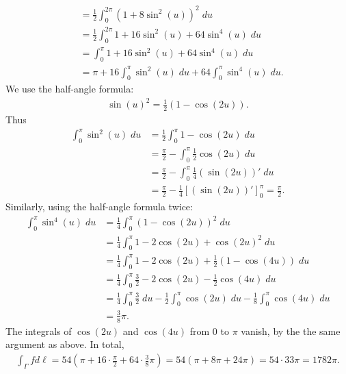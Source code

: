 \documentclass[11pt]{article}
\begin{document}
\begin{solution}
\begin{align*}
        \\&=
        \frac {1} 2 \int_0^{2\pi} \left( 1 + 8 \sin^2(u) \right)^{2} \;du
        \\&=
        \frac {1} 2 \int_0^{2\pi} 1 + 16 \sin^2(u) + 64 \sin^4(u) \;du
        \\&=
        \int_0^{\pi} 1 + 16 \sin^2(u) + 64 \sin^4(u) \;du
        \\&=
        \pi + 16 \int_0^{\pi} \sin^2(u) \;du + 64 \int_0^{\pi} \sin^4(u) \;du
        .
    \end{align*}
    We use the half-angle formula:
    \begin{align*}
        \sin(u)^2 = \frac 1 2 \left( 1 - \cos(2u) \right).
    \end{align*}
    Thus
    \begin{align*}
        \int_0^{\pi} \sin^2(u) \;du
        &=
        \frac 1 2 \int_0^{\pi} 1 - \cos(2u) \;du
        \\&=
        \frac \pi 2 - \int_0^{\pi} \frac 1 2 \cos(2u) \;du
        \\&=
        \frac \pi 2 - \int_0^{\pi} \frac 1 4 (\sin(2u))' \;du
        \\&=
        \frac \pi 2 - \frac 1 4 \left[ (\sin(2u))' \right]_0^\pi
        =
        \frac \pi 2
        .
    \end{align*}
    Similarly, using the half-angle formula twice: 
    \begin{align*}
        \int_0^{\pi} \sin^4(u) \;du
        &=
        \frac 1 4 \int_0^{\pi} \left( 1 - \cos(2u) \right)^2 \;du
        \\&=
        \frac 1 4 \int_0^{\pi} 1 - 2 \cos(2u) + \cos(2u)^2 \;du
        \\&=
        \frac 1 4 \int_0^{\pi} 1 - 2 \cos(2u) + \frac 1 2 \left( 1 - \cos(4u) \right) \;du
        \\&=
        \frac 1 4 \int_0^{\pi} \frac 3 2 - 2 \cos(2u) - \frac 1 2 \cos(4u) \;du
        \\&=
        \frac 1 4 \int_0^{\pi} \frac 3 2 \;du - \frac 1 2 \int_0^{\pi} \cos(2u) \;du - \frac 1 8 \int_0^{\pi} \cos(4u) \;du
        \\&=
        \frac 3 8 \pi
        .
    \end{align*}
    The integrals of $\cos(2u)$ and $\cos(4u)$ from $0$ to $\pi$ vanish, by the the same argument as above. 
    In total,
    \begin{align*}
        \int_\Gamma f d\ell
        =
        54
        \left(
            \pi + 16 \cdot \frac \pi 2 + 64 \cdot \frac 3 8 \pi
        \right)
        =
        54
        \left(
        \pi + 8\pi + 24 \pi
        \right)
        =
        54 \cdot 33 \pi
        =
        1782 \pi
        .
    \end{align*}
\end{solution}
\end{document}

